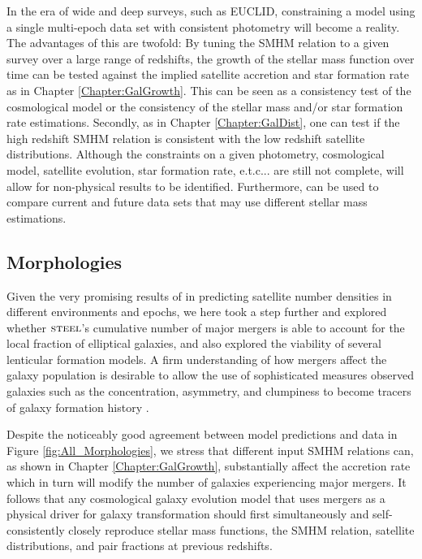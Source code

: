 In the era of wide and deep surveys, such as EUCLID, constraining a model using a single multi-epoch data set with consistent photometry will become a reality. The advantages of this are twofold: By tuning the SMHM relation to a given survey over a large range of redshifts, the growth of the stellar mass function over time can be tested against the implied satellite accretion and star formation rate as in Chapter \ref{Chapter:GalGrowth}. This can be seen as a consistency test of the cosmological model or the consistency of the stellar mass and/or star formation rate estimations. Secondly, as in Chapter \ref{Chapter:GalDist}, one can test if the high redshift SMHM relation is consistent with the low redshift satellite distributions. Although the constraints on a given photometry, cosmological model, satellite evolution, star formation rate, e.t.c... are still not complete, \steel will allow for non-physical results to be identified. Furthermore, \steel can be used to compare current and future data sets that may use different stellar mass estimations.

\subsection{Morphologies}

Given the very promising results of \steel in predicting satellite number densities in different environments and epochs, we here took a step further and explored whether $\textsc{steel}$'s cumulative number of major mergers is able to account for the local fraction of elliptical galaxies, and also explored the viability of several lenticular formation models. A firm understanding of how mergers affect the galaxy population is desirable to allow the use of sophisticated measures observed galaxies such as the concentration, asymmetry, and clumpiness to become tracers of galaxy formation history \cite{Hambleton2011AdvancedGalaxies}.

Despite the noticeably good agreement between model predictions and data in Figure \ref{fig:All_Morphologies}, we stress that different input SMHM relations can, as shown in Chapter \ref{Chapter:GalGrowth}, substantially affect the accretion rate which in turn will modify the number of galaxies experiencing major mergers. It follows that any cosmological galaxy evolution model that uses mergers as a physical driver for galaxy transformation should first simultaneously and self-consistently closely reproduce stellar mass functions, the SMHM relation, satellite distributions, and pair fractions at previous redshifts.

